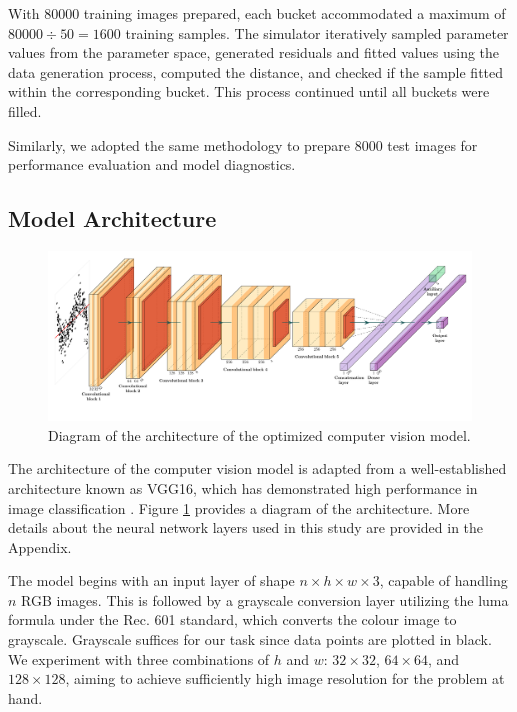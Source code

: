 \documentclass[]{interact}
\theoremstyle{plain}%
\theoremstyle{definition}
\theoremstyle{remark}
\begin{document}
With 80000 training images prepared, each bucket accommodated a maximum
of \(80000 \div 50 = 1600\) training samples. The simulator iteratively
sampled parameter values from the parameter space, generated residuals
and fitted values using the data generation process, computed the
distance, and checked if the sample fitted within the corresponding
bucket. This process continued until all buckets were filled.

Similarly, we adopted the same methodology to prepare 8000 test images
for performance evaluation and model diagnostics.

\subsection{Model Architecture}\label{model-architecture}

\begin{figure}

{\centering \includegraphics[width=1\linewidth]{cnn} 

}

\caption{Diagram of the architecture of the optimized computer vision model.}\label{fig:cnn-diag}
\end{figure}

The architecture of the computer vision model is adapted from a
well-established architecture known as VGG16, which has demonstrated
high performance in image classification \citep{simonyan2014very}.
Figure \ref{fig:cnn-diag} provides a diagram of the architecture. More
details about the neural network layers used in this study are provided
in the Appendix.

The model begins with an input layer of shape
\(n \times h \times w \times 3\), capable of handling \(n\) RGB images.
This is followed by a grayscale conversion layer utilizing the luma
formula under the Rec. 601 standard, which converts the colour image to
grayscale. Grayscale suffices for our task since data points are plotted
in black. We experiment with three combinations of \(h\) and \(w\):
\(32 \times 32\), \(64 \times 64\), and \(128 \times 128\), aiming to
achieve sufficiently high image resolution for the problem at hand.
\end{document}
